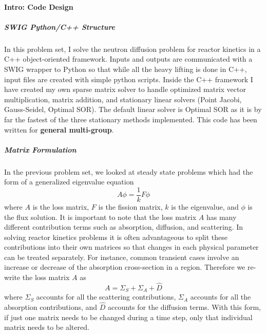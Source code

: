 \documentclass[12pt]{report}
\begin{document}
	
	
	\maketitle
	
	\paragraph{Intro: Code Design}
	\subparagraph{SWIG Python/C++ Structure}
	In this problem set, I solve the neutron diffusion problem for reactor kinetics in a C++ object-oriented framework. Inputs and outputs are communicated with a SWIG wrapper to Python so that while all the heavy lifting is done in C++, input files are created with simple python scripts. Inside the C++ framework I have created my own sparse matrix solver to handle optimized matrix vector multiplication, matrix addition, and stationary linear solvers (Point Jacobi, Gauss-Seidel, Optimal SOR). The default linear solver is Optimal SOR as it is by far the fastest of the three stationary methods implemented. This code has been written for \textbf{general multi-group}.
	
	\subparagraph{Matrix Formulation}
	In the previous problem set, we looked at steady state problems which had the form of a generalized eigenvalue equation
	\begin{equation}
	A \phi = \frac{1}{k} F \phi
	\end{equation}
	where $A$ is the loss matrix, $F$ is the fission matrix, $k$ is the eigenvalue, and $\phi$ is the flux solution. It is important to note that the loss matrix $A$ has many different contribution terms such as absorption, diffusion, and scattering. In solving reactor kinetics problems it is often advantageous to split these contributions into their own matrices so that changes in each physical parameter can be treated separately. For instance, common transient cases involve an increase or decrease of the absorption cross-section in a region. Therefore we re-write the loss matrix $A$ as
	\begin{equation}
	A = \Sigma_S + \Sigma_A + \hat{D}
	\end{equation}
	where $\Sigma_S$ accounts for all the scattering contributions, $\Sigma_A$ accounts for all the absorption contributions, and $\hat{D}$ accounts for the diffusion terms. With this form, if just one matrix needs to be changed during a time step, only that individual matrix needs to be altered. 
	
\end{document}
